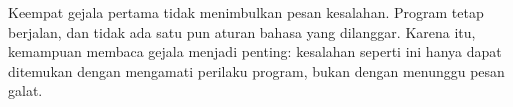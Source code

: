 Keempat gejala pertama tidak menimbulkan pesan kesalahan.
Program tetap berjalan, dan tidak ada satu pun aturan bahasa yang dilanggar.
Karena itu, kemampuan membaca gejala menjadi penting: kesalahan seperti ini
hanya dapat ditemukan dengan mengamati perilaku program, bukan dengan
menunggu pesan galat.
